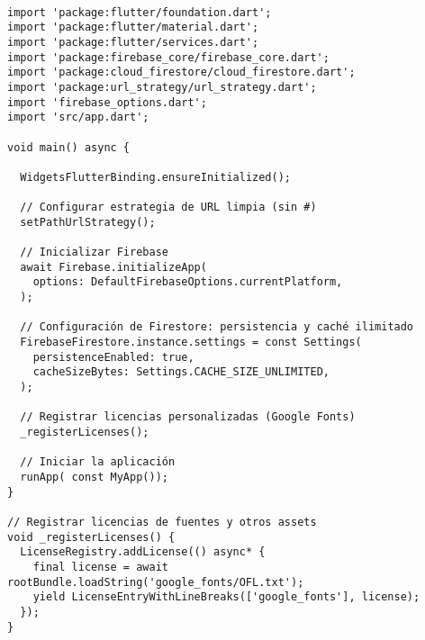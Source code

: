 \begin{verbatim}

import 'package:flutter/foundation.dart';
import 'package:flutter/material.dart';
import 'package:flutter/services.dart';
import 'package:firebase_core/firebase_core.dart';
import 'package:cloud_firestore/cloud_firestore.dart';
import 'package:url_strategy/url_strategy.dart';
import 'firebase_options.dart';
import 'src/app.dart'; 

void main() async {
  
  WidgetsFlutterBinding.ensureInitialized();

  // Configurar estrategia de URL limpia (sin #)
  setPathUrlStrategy();

  // Inicializar Firebase
  await Firebase.initializeApp(
    options: DefaultFirebaseOptions.currentPlatform,
  );

  // Configuración de Firestore: persistencia y caché ilimitado
  FirebaseFirestore.instance.settings = const Settings(
    persistenceEnabled: true,
    cacheSizeBytes: Settings.CACHE_SIZE_UNLIMITED,
  );

  // Registrar licencias personalizadas (Google Fonts)
  _registerLicenses();

  // Iniciar la aplicación
  runApp( const MyApp());
}

// Registrar licencias de fuentes y otros assets
void _registerLicenses() {
  LicenseRegistry.addLicense(() async* {
    final license = await rootBundle.loadString('google_fonts/OFL.txt');
    yield LicenseEntryWithLineBreaks(['google_fonts'], license);
  });
}
\end{verbatim}


\newpage






